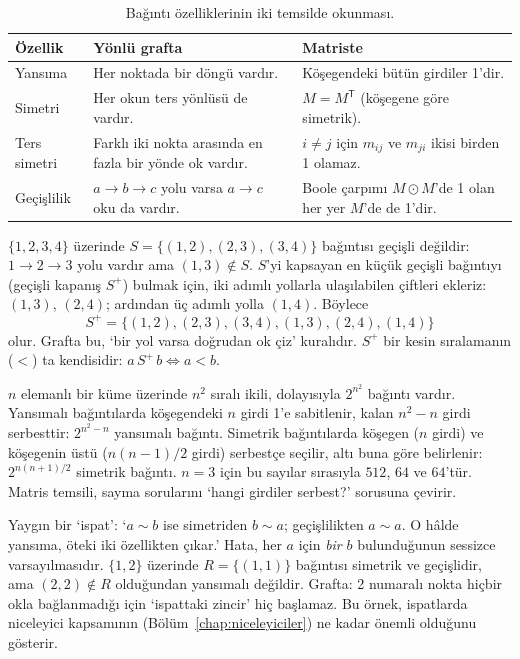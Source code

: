 \begin{table}[htbp]
\centering\small
\renewcommand{\arraystretch}{1.3}
\begin{tabularx}{\linewidth}{>{\raggedright\arraybackslash}p{2.1cm}>{\raggedright\arraybackslash}X>{\raggedright\arraybackslash}X}
\toprule
\textbf{Özellik} & \textbf{Yönlü grafta} & \textbf{Matriste}\\
\midrule
Yansıma & Her noktada bir döngü vardır. & Köşegendeki bütün girdiler 1’dir.\\
Simetri & Her okun ters yönlüsü de vardır. & $M=M^{\mathsf T}$ (köşegene göre simetrik).\\
Ters simetri & Farklı iki nokta arasında en fazla bir yönde ok vardır. & $i\neq j$ için $m_{ij}$ ve $m_{ji}$ ikisi birden 1 olamaz.\\
Geçişlilik & $a\to b\to c$ yolu varsa $a\to c$ oku da vardır. & Boole çarpımı $M\odot M$’de 1 olan her yer $M$’de de 1’dir.\\
\bottomrule
\end{tabularx}
\caption{Bağıntı özelliklerinin iki temsilde okunması.}
\end{table}

\begin{ornek}
$\{1,2,3,4\}$ üzerinde $S=\{(1,2),(2,3),(3,4)\}$ bağıntısı geçişli değildir: $1\to2\to3$ yolu vardır ama $(1,3)\notin S$. $S$’yi kapsayan en küçük geçişli bağıntıyı (geçişli kapanış $S^+$) bulmak için, iki adımlı yollarla ulaşılabilen çiftleri ekleriz: $(1,3)$, $(2,4)$; ardından üç adımlı yolla $(1,4)$. Böylece
\[
S^+=\{(1,2),(2,3),(3,4),(1,3),(2,4),(1,4)\}
\]
olur. Grafta bu, ‘bir yol varsa doğrudan ok çiz’ kuralıdır. $S^+$ bir kesin sıralamanın ($<$) ta kendisidir: $a\,S^+\,b\iff a<b$.
\end{ornek}

\begin{ornek}
$n$ elemanlı bir küme üzerinde $n^2$ sıralı ikili, dolayısıyla $2^{n^2}$ bağıntı vardır. Yansımalı bağıntılarda köşegendeki $n$ girdi 1’e sabitlenir, kalan $n^2-n$ girdi serbesttir: $2^{n^2-n}$ yansımalı bağıntı. Simetrik bağıntılarda köşegen ($n$ girdi) ve köşegenin üstü ($n(n-1)/2$ girdi) serbestçe seçilir, altı buna göre belirlenir: $2^{n(n+1)/2}$ simetrik bağıntı. $n=3$ için bu sayılar sırasıyla $512$, $64$ ve $64$’tür. Matris temsili, sayma sorularını ‘hangi girdiler serbest?’ sorusuna çevirir.
\end{ornek}

\begin{yanilgi}
Yaygın bir ‘ispat’: ‘$a\sim b$ ise simetriden $b\sim a$; geçişlilikten $a\sim a$. O hâlde yansıma, öteki iki özellikten çıkar.’ Hata, her $a$ için \emph{bir} $b$ bulunduğunun sessizce varsayılmasıdır. $\{1,2\}$ üzerinde $R=\{(1,1)\}$ bağıntısı simetrik ve geçişlidir, ama $(2,2)\notin R$ olduğundan yansımalı değildir. Grafta: 2 numaralı nokta hiçbir okla bağlanmadığı için ‘ispattaki zincir’ hiç başlamaz. Bu örnek, ispatlarda niceleyici kapsamının (Bölüm~\ref{chap:niceleyiciler}) ne kadar önemli olduğunu gösterir.
\end{yanilgi}

